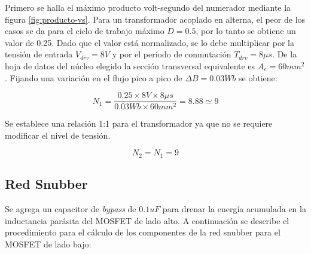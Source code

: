 Primero se halla el máximo producto volt-segundo del numerador mediante la figura \ref{fig:producto-vs}.
Para un transformador acoplado en alterna, el peor de los casos se da para el ciclo de trabajo máximo $D=0.5$, por lo tanto se obtiene un valor de 0.25. 
Dado que el valor está normalizado, se lo debe multiplicar por la tensión de entrada $V_{drv}=8V$ y por el período de conmutación $T_{drv}=8\mu s$.
De la hoja de datos del núcleo elegido la sección transversal equivalente es $A_{e}=60mm^2$. 
Fijando una variación en el flujo pico a pico de $\Delta B=0.03Wb$ se obtiene: 

$$ N_{1}=\frac {0.25\times 8V \times 8\mu s}{0.03Wb \times 60mm^2}=8.88\simeq 9 $$

Se establece una relación 1:1 para el transformador ya que no se requiere modificar el nivel de tensión.

$$ N_{2}=N_{1}=9 $$

\subsection{Red Snubber}

Se agrega un capacitor de \textit{bypass} de $0.1uF$ para drenar la energía acumulada en la inductancia parásita del MOSFET de lado alto.   
A continuación se describe el procedimiento para el cálculo de los componentes de la red snubber para el MOSFET de lado bajo:

